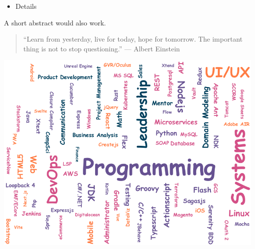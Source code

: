 \documentclass[10pt,a4paper,ragged2e,withhyper]{altacv}
\begin{document}
\begin{paracol}{2}
\bigskip



% 
\begin{itemize}
\item Details
\end{itemize}

\divider

A short abstract would also work.


\nocite{*}

% 
% 
% 
% 

\switchcolumn


\begin{quote}
``Learn from yesterday, live for today, hope for tomorrow. The important thing is not to stop questioning.''
— Albert Einstein
\end{quote}

\medskip

% 
% 
% 
% 
% 



\begin{minipage}{7.1cm}
	\includegraphics[width=\linewidth]{skillcloud.png}
\end{minipage}%


\end{paracol}
\end{document}
